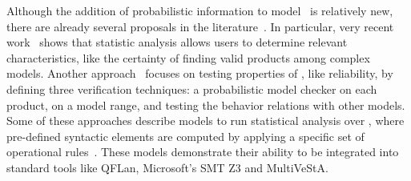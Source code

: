 %		
%				
%				
%		
%	
%	
%
%
Although the addition of probabilistic information to model \SPLs\ is relatively new, there are already several proposals in the literature~\cite{chssgl13,tllv15,tlll15,dpcslsh17}. In particular, very recent 
work~\cite{dpcslsh17} shows that statistic analysis allows users to determine relevant characteristics, like the certainty of finding valid products among complex models.
%
Another approach~\cite{chssgl13} focuses on testing properties of \SPLs, like reliability, by defining three verification techniques: a probabilistic model checker on each product, on a model range, and testing the behavior relations with other models.
%
Some of these approaches describe models to run statistical analysis over \SPLs, where pre-defined syntactic elements are computed by applying a specific set of operational rules~\cite{tllv15,tlll15}. These models demonstrate their ability to be integrated into standard tools like QFLan, Microsoft's SMT Z3 and MultiVeStA.
%
%

